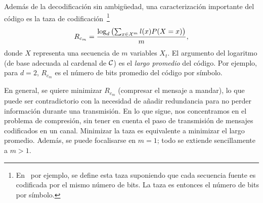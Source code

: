 \begin{figure}[h!]
%
\begin{center}  \end{center}
%
%
\label{Fig:SZ:ClasesCodigos}
\end{figure}

Adem\'as  de   la  decodificaci\'on  sin   ambig\"uedad,  una  caracterizaci\'on
importante del  c\'odigo es la  taza de codificaci\'on~\footnote{En~\cite{Rio07}
  por  ejemplo, se  define esta  taza suponiendo  que cada  secuencia  fuente es
  codificada por el  mismo n\'umero de bits. La taza es  entonces el n\'umero de
  bits por s\'imbolo.}
%
\[
R_{c_m} = \frac{\log_d \left( \sum_{x \in \mathcal{X}^m} l(x) P(X = x) \right)}{m},
\]
%
donde $X$  representa una  secuencia de $m$  variables $X_t$.  El  argumento del
logaritmo (de base adecuada al cardenal  de $\mathcal{C}$) es el {\it largo promedio} del
c\'odigo. Por ejemplo,  para $d = 2$, $R_{c_m}$ es el  n\'umero de bits promedio
del c\'odigo por s\'imbolo.

En general,  se quiere minimizar $R_{c_m}$  (compresar el mensaje  a mandar), lo
que puede  ser contradictorio con la  necesidad de a\~nadir  redundancia para no
perder  informaci\'on   durante  una  transmisi\'on.   En  lo   que  sigue,  nos
concentramos en  el problema  de compresi\'on,  sin tener en  cuenta el  paso de
transmisi\'on  de  mensajes codificados  en  un  canal.   Minimizar la  taza  es
equivalente a minimizar el largo  promedio. Adem\'as, se puede focalisarse en $m
= 1$; todo se extiende sencillamente a $m > 1$.

